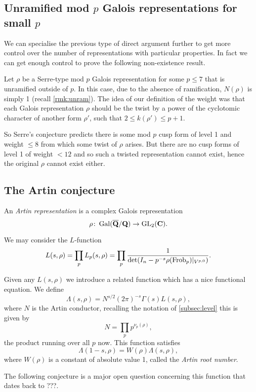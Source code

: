 \documentclass[a4paper,12pt]{article}
\begin{document}
\subsection{Unramified mod $p$ Galois representations for small $p$}\label{subsec:small}
We can specialise the previous type of direct argument further to get more control over the number of representations with particular properties.
In fact we can get enough control to prove the following non-existence result.

Let $\rho$ be a Serre-type mod $p$ Galois representation for some $p \le 7$ that is unramified outside of $p$.
In this case, due to the absence of ramification, $N(\rho)$ is simply 1 (recall \cref{rmk:unram}).
The idea of our definition of the weight was that each Galois representation $\rho$ should be the twist by a power of the cyclotomic character of another form $\rho'$, such that $ 2\le k(\rho')\le p + 1$.

So Serre's conjecture predicts there is some mod $p$ cusp form of level 1 and weight $\le 8$ from which some twist of $\rho$ arises.
But there are no cusp forms of level 1 of weight $< 12$ and so such a twisted representation cannot exist, hence the original $\rho$ cannot exist either.

\iffalse
\subsection{The Artin conjecture}\label{sec:artin}
\begin{defn}
An \emph{Artin representation} is a complex Galois representation
\[
\rho\colon \operatorname{Gal}(\overline{\mathbf{Q}}/\mathbf{Q}) \to \operatorname{GL}_2(\mathbf{C}).
\]
\end{defn}

We may consider the $L$-function
\[
L(s, \rho) = \prod_{p} L_p(s,\rho) = \prod_{p} \frac{1}{\det(I_n - p^{-s}\rho(\operatorname{Frob}_p) |_{V^{p,0}})}.
\]

Given any $L(s,\rho)$ we introduce a related function which has a nice functional equation.
We define
\[
\Lambda(s, \rho) = N^{s/2} (2\pi)^{-s} \Gamma(s)L(s,\rho),
\]
where $N$ is the Artin conductor, recalling the notation of \cref{subsec:level} this is given by
\[
N = \prod_{p}p^{\nu_p(\rho)},
\]
the product running over all $p$ now.
This function satisfies
\[
\Lambda(1-s, \rho) = W(\rho)\Lambda(s,\rho),
\]
where $W(\rho)$ is a constant of absolute value 1, called the \emph{Artin root number}.

The following conjecture is a major open question concerning this function that dates back to ???.
\end{document}
